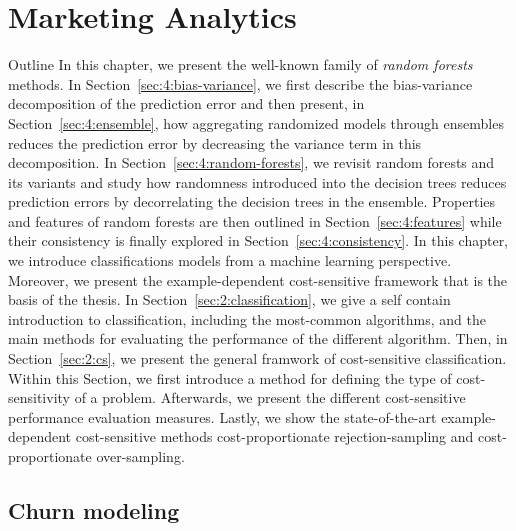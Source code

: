 \chapter{Marketing Analytics}

\begin{remark}{Outline}
In this chapter, we present the well-known family of \textit{random forests}
methods. In Section~\ref{sec:4:bias-variance}, we first describe the bias-variance
decomposition of the prediction error and then present, in
Section~\ref{sec:4:ensemble}, how aggregating randomized models through
ensembles reduces the prediction error by decreasing the variance term in this
decomposition. In Section~\ref{sec:4:random-forests}, we revisit random forests
and its variants and study how randomness introduced into the decision trees
reduces prediction errors by decorrelating the decision
trees in the ensemble. Properties and features of random forests are then outlined
in Section~\ref{sec:4:features} while their consistency
is finally explored in Section~\ref{sec:4:consistency}.
In this chapter, we introduce classifications models from a machine learning perspective. 
Moreover, we present the example-dependent cost-sensitive framework that is the basis of the 
thesis. In Section~\ref{sec:2:classification}, we give a self contain introduction to 
classification, including the most-common algorithms, and the main methods for evaluating the 
performance of the different algorithm. Then, in Section~\ref{sec:2:cs}, we present the general 
framwork of cost-sensitive classification. Within this Section, we first introduce a method for 
defining the type of cost-sensitivity of a problem. Afterwards, we present the different 
cost-sensitive performance evaluation measures. Lastly, we show the state-of-the-art 
example-dependent cost-sensitive methods cost-proportionate rejection-sampling and 
cost-proportionate over-sampling.
\end{remark}


\section{Churn modeling}
\label{sec:4:churn}

